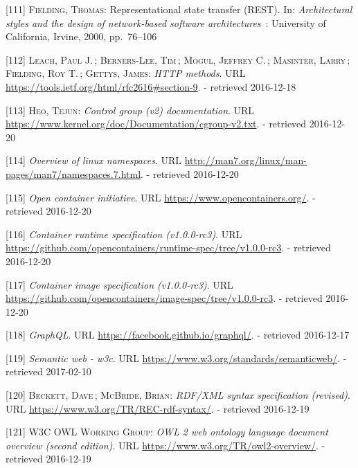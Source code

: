 \documentclass[12pt,english,a4paper,titlepage,cleardoublepage=empty,dottedtoc]{report}
\begin{document}
\hypertarget{ref-web_spec_rest}{}
{[}111{]} \textsc{Fielding, Thomas}: Representational state transfer
(REST). In: \emph{Architectural styles and the design of network-based
software architectures}~: University of California, Irvine, 2000,
pp.~76--106

\hypertarget{ref-web_spec_http-methods}{}
{[}112{]} \textsc{Leach, Paul J.}\,; \textsc{Berners-Lee, Tim}\,;
\textsc{Mogul, Jeffrey C.}\,; \textsc{Masinter, Larry}\,;
\textsc{Fielding, Roy T.}\,; \textsc{Gettys, James}: \emph{HTTP
methods}. URL \url{https://tools.ietf.org/html/rfc2616\#section-9}. -
retrieved 2016-12-18

\hypertarget{ref-web_2015_cgroup-doc}{}
{[}113{]} \textsc{Heo, Tejun}: \emph{Control group (v2) documentation}.
URL \url{https://www.kernel.org/doc/Documentation/cgroup-v2.txt}. -
retrieved 2016-12-20

\hypertarget{ref-web_2016_kernel-namespace}{}
{[}114{]} \emph{Overview of linux namespaces}. URL
\url{http://man7.org/linux/man-pages/man7/namespaces.7.html}. -
retrieved 2016-12-20

\hypertarget{ref-web_2016_open-container-initiative}{}
{[}115{]} \emph{Open container initiative}. URL
\url{https://www.opencontainers.org/}. - retrieved 2016-12-20

\hypertarget{ref-web_oci-spec_runtime}{}
{[}116{]} \emph{Container runtime specification (v1.0.0-rc3)}. URL
\url{https://github.com/opencontainers/runtime-spec/tree/v1.0.0-rc3}. -
retrieved 2016-12-20

\hypertarget{ref-web_oci-spec_image}{}
{[}117{]} \emph{Container image specification (v1.0.0-rc3)}. URL
\url{https://github.com/opencontainers/image-spec/tree/v1.0.0-rc3}. -
retrieved 2016-12-20

\hypertarget{ref-web_spec_graphql}{}
{[}118{]} \emph{GraphQL}. URL \url{https://facebook.github.io/graphql/}.
- retrieved 2016-12-17

\hypertarget{ref-web_2016_w3c_semantic-web-activity}{}
{[}119{]} \emph{Semantic web - w3c}. URL
\url{https://www.w3.org/standards/semanticweb/}. - retrieved 2017-02-10

\hypertarget{ref-web_w3c-tr_rdf}{}
{[}120{]} \textsc{Beckett, Dave}\,; \textsc{McBride, Brian}:
\emph{RDF/XML syntax specification (revised)}. URL
\url{https://www.w3.org/TR/REC-rdf-syntax/}. - retrieved 2016-12-19

\hypertarget{ref-web_w3c-tr_owl}{}
{[}121{]} \textsc{W3C OWL Working Group}: \emph{OWL 2 web ontology
language document overview (second edition)}. URL
\url{https://www.w3.org/TR/owl2-overview/}. - retrieved 2016-12-19
\end{document}
